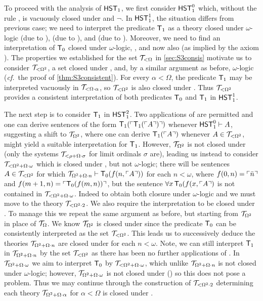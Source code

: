 \documentclass[UKenglish,cleveref,DIV=12]{scrartcl}
\theoremstyle{definition}
\theoremstyle{definition}
\begin{document}
To proceed with the analysis of $\mathsf{HST}_1$, we first consider $\mathsf{HST}_1^0$ which, without
the rule , is vacuously closed
under  and $\lnot$. In $\mathsf{HST}_1^1$, the situation differs
from previous case; we need to interpret the predicate $\mathsf{T}_1$ as a theory closed
under $\omega$-logic (due to ),  (due to ),
 and  (due to ). Moreover, we need to find an interpretation of $\mathsf{T}_0$ closed under $\omega$-logic, , and now also  (as
implied by the axiom ). The properties we established for the set
$\mathcal{T}_{<\Omega}$
in \cref{sec:S3consis} motivate us to consider $\mathcal{T}_{<\Omega^2}$, a set
closed under ,  and, by a
similar argument as before, $\omega$-logic ({\emph{cf.}~the proof of
\cref{thm:S3consistent}}). For every $\alpha<\Omega$, the predicate
$\mathsf{T}_1$ may be interpreted vacuously in $\mathcal{T}_{<\Omega\cdot\alpha}$, so
$\mathcal{T}_{<\Omega^2}$ is also closed under . Thus $\mathcal{T}_{<\Omega^2}$
provides a consistent interpretation of both predicates $\mathsf{T}_0$ and $\mathsf{T}_1$ in
$\mathsf{HST}_1^1$.

The next step is to consider $\mathsf{T}_1$ in $\mathsf{HST}_1^2$. Two applications of
 are permitted and one can derive sentences of the form $\mathsf{T}_1(\ulcorner{\mathsf{T}_1(\ulcorner{A}\urcorner)}\urcorner)$
whenever $\mathsf{HST}_1^0\vdash A$,  suggesting a
shift to $\mathcal{T}_{\Omega^2}$, where one can derive $\mathsf{T}_1(\ulcorner{A}\urcorner)$ whenever
$A\in\mathcal{T}_{<\Omega^2}$, might yield a suitable interpretation for $\mathsf{T}_1$. However,
$\mathcal{T}_{\Omega^2}$ is not closed under  (only the systems
$\mathcal{T}_{<\rho+\Omega\cdot \sigma}$ for limit ordinals $\sigma$ are), leading us instead to consider
$\mathcal{T}_{<\Omega^2+\Omega\cdot\omega}$ which is closed under , but not
$\omega$-logic; there will be sentences $A\in\mathcal{T}_{<\Omega^2}$ for which
$\mathcal{T}_{\Omega^2+\Omega\cdot n}\vdash \mathsf{T}_0(f(n,\ulcorner{A}\urcorner))$ for each $n<\omega$, where
$f(0,n)=\ulcorner{\bar n}\urcorner$ and $f(m+1,n)=\ulcorner{\mathsf{T}_0({f(m,n)})}\urcorner$, but the sentence $\forall x\,
\mathsf{T}_0(f(x,\ulcorner{A}\urcorner)$ is not contained in $\mathcal{T}_{<\Omega^2+\Omega\cdot\omega}$. Indeed to obtain
both closure under $\omega$-logic and  we must move to the theory
$\mathcal{T}_{<\Omega^2\cdot2}$. We also require the interpretation to be closed under
. To manage this we repeat the same argument as before, but starting
from $\mathcal{T}_{\Omega^2}$ in place of $\mathcal{T}_{\Omega}$. We know $\mathcal{T}_{\Omega^2}$ is closed
under  since the predicate $\mathsf{T}_0$ can be consistently interpreted
as the set $\mathcal{T}_{<\Omega^2}$. This leads us to successively deduce the theories
$\mathcal{T}_{\Omega^2+\Omega\cdot n}$ are closed under  for each
$n<\omega$. Note, we can still interpret $\mathsf{T}_1$ in $\mathcal{T}_{\Omega^2+\Omega\cdot n}$ by the set
$\mathcal{T}_{<\Omega^2}$  as there has been no further
applications of . In $\mathcal{T}_{\Omega^2+\Omega\cdot \omega}$ we aim to interpret
$\mathsf{T}_0$ by $\mathcal{T}_{<\Omega^2+\Omega\cdot \omega}$, which unlike $\mathcal{T}_{\Omega^2+\Omega\cdot n}$ is not closed
under $\omega$-logic; however, $\mathcal{T}_{\Omega^2+\Omega\cdot \omega}$ is not closed under
() so this does not pose a problem. Thus we
may continue through the construction of $\mathcal{T}_{<\Omega^2\cdot2}$ determining
each theory $\mathcal{T}_{\Omega^2+\Omega\cdot \alpha}$ for $\alpha<\Omega$ is closed under
.
\end{document}
